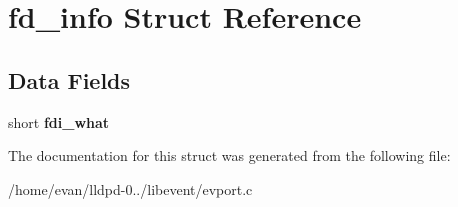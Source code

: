 \section{fd\-\_\-info \-Struct \-Reference}
\label{structfd__info}
\subsection*{\-Data \-Fields}
\begin{DoxyCompactItemize}
\item 
short {\bfseries fdi\-\_\-what}\label{structfd__info_a3c5d5dcc826719354aa70b690c60e15f}

\end{DoxyCompactItemize}


\-The documentation for this struct was generated from the following file\-:\begin{DoxyCompactItemize}
\item 
/home/evan/lldpd-\/0../libevent/evport.\-c\end{DoxyCompactItemize}
